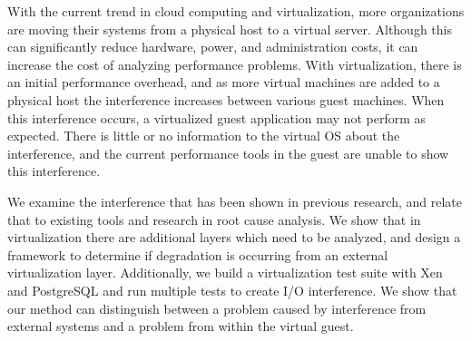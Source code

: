 With the current trend in cloud computing and virtualization, more organizations are moving their systems from a physical host to a virtual server.  Although this can significantly reduce hardware, power, and administration costs, it can increase the cost of analyzing performance problems.  With virtualization, there is an initial performance overhead, and as more virtual machines are added to a physical host the interference increases between various guest machines.   When this interference occurs, a virtualized guest application may not perform as expected.   There is little or no information to the virtual OS about the interference, and the current performance tools in the guest are unable to show this interference.

We examine the interference that has been shown in previous research, and relate that to existing tools and research in root cause analysis.  We show that in virtualization there are additional layers which need to be analyzed, and design a framework to determine if degradation is occurring from an external virtualization layer.  Additionally, we build a virtualization test suite with Xen and PostgreSQL and run multiple tests to create I/O interference.  We show that our method can distinguish between a problem caused by interference from external systems  and a problem from within the virtual guest.
 
